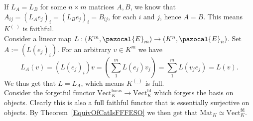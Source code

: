 \begin{example}
        If $L_A = L_B$ for some $n\times m$ matrices $A,B$, we know that $A_{ij}=(L_A e_j)_i = (L_B e_j)_i = B_{ij}$, for each $i$ and $j$, hence $A=B$. This means $K^{(\_)}$ is faithful.\\
        Consider a linear map $L : (K^m,\pazocal{E}_m)\rightarrow (K^n,\pazocal{E}_n)$. Set $A:= (L(e_j)_i)$. For an arbitrary $v\in K^m$ we have 
        $$
            L_A (v) = (L(e_j)_i) v = (\sum_1^m L(e_j) v_j)= \sum_1^m L(v_j e_j) = L(v). 
        $$
        We thus get that $L = L_A$, which means $K^{(\_)}$ is full.\\
        Consider the forgetful functor $\mathrm{Vect}_K^\mathrm{basis}\rightarrow \mathrm{Vect}_K^\mathrm{fd}$ which forgets the basis on objects. Clearly this is also a full faithful functor that is essentially surjective on objects. By Theorem~\ref{EquivOfCatIsFFFESO} we then get that $\mathrm{Mat}_K\simeq \mathrm{Vect}_K^\mathrm{fd}$.
    \end{example}


